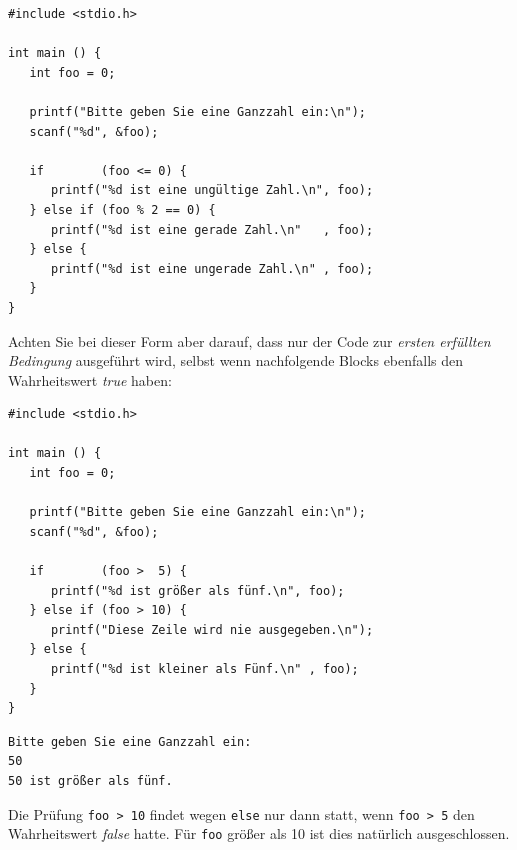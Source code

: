 \begin{codebox}
\begin{verbatim}
#include <stdio.h>

int main () {
   int foo = 0;
   
   printf("Bitte geben Sie eine Ganzzahl ein:\n");
   scanf("%d", &foo);
   
   if        (foo <= 0) {
      printf("%d ist eine ungültige Zahl.\n", foo);
   } else if (foo % 2 == 0) {
      printf("%d ist eine gerade Zahl.\n"   , foo);
   } else {
      printf("%d ist eine ungerade Zahl.\n" , foo);
   }
}
\end{verbatim}
\end{codebox}

Achten Sie bei dieser Form aber darauf, dass nur der Code zur \emph{ersten erfüllten Bedingung} ausgeführt wird, selbst wenn nachfolgende Blocks ebenfalls den Wahrheitswert \emph{true} haben:

\begin{codebox}
\begin{verbatim}
#include <stdio.h>

int main () {
   int foo = 0;
   
   printf("Bitte geben Sie eine Ganzzahl ein:\n");
   scanf("%d", &foo);
   
   if        (foo >  5) {
      printf("%d ist größer als fünf.\n", foo);
   } else if (foo > 10) {
      printf("Diese Zeile wird nie ausgegeben.\n");
   } else {
      printf("%d ist kleiner als Fünf.\n" , foo);
   }
}
\end{verbatim}
\end{codebox}

\begin{cmdbox}
\begin{verbatim}
Bitte geben Sie eine Ganzzahl ein:
50
50 ist größer als fünf.
\end{verbatim}
\end{cmdbox}

Die Prüfung \texttt{foo > 10} findet wegen \texttt{else} nur dann statt, wenn \texttt{foo > 5} den Wahrheitswert \emph{false} hatte. Für \texttt{foo} größer als 10 ist dies natürlich ausgeschlossen.

